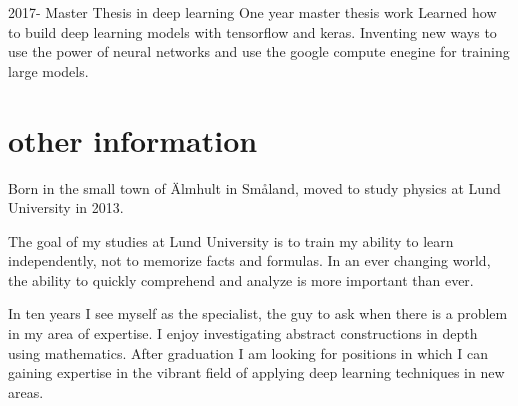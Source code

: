\documentclass[]{twentysecondcv}
\begin{document}
\begin{twenty}
  \twentyitem
      {2017-}
      {Master Thesis in deep learning}
      {One year master thesis work}
      {Learned how to build deep learning models with
        tensorflow and keras. Inventing new ways to use the power of
        neural networks and use the google compute enegine for
        training large models.}
\end{twenty}

\section{other information}
Born in the small town of \"Almhult in Sm\aa land, moved to study
physics at Lund University in 2013.

The goal of my studies at Lund University is to train my ability to
learn independently, not to memorize facts and formulas. In an ever
changing world, the ability to quickly comprehend and analyze is more
important than ever.

In ten years I see myself as the specialist, the guy to ask when there
is a problem in my area of expertise. I enjoy investigating abstract
constructions in depth using mathematics. After graduation I am
looking for positions in which I can gaining expertise in the vibrant
field of applying deep learning techniques in new areas.

\end{document}
